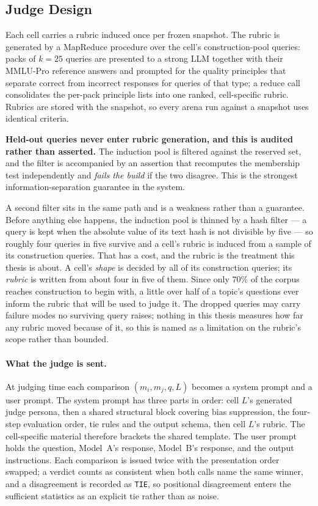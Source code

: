 \subsection{Judge Design}\label{sec:arch-judge}

Each cell carries a rubric induced once per frozen snapshot. The rubric
is generated by a MapReduce procedure over the cell's construction-pool
queries: packs of $k = 25$ queries are presented to a strong LLM
together with their MMLU-Pro reference answers and prompted for the
quality principles that separate correct from incorrect responses for
queries of that type; a reduce call consolidates the per-pack principle
lists into one ranked, cell-specific rubric. Rubrics are stored with
the snapshot, so every arena run against a snapshot uses identical
criteria.

\textbf{Held-out queries never enter rubric generation, and this is
audited rather than asserted.} The induction pool is filtered against
the reserved set, and the filter is accompanied by an assertion that
recomputes the membership test independently and \emph{fails the build}
if the two disagree. This is the strongest information-separation
guarantee in the system.

A second filter sits in the same path and is a weakness rather than a
guarantee. Before anything else happens, the induction pool is thinned
by a hash filter --- a query is kept when the absolute value of its
text hash is not divisible by five --- so roughly four queries in five
survive and a cell's rubric is induced from a sample of its
construction queries.
That has a cost, and the rubric is the treatment this thesis is about. A cell's \emph{shape} is decided by
all of its construction queries; its \emph{rubric} is written from
about four in five of them. Since only $70\%$ of the corpus reaches
construction to begin with, a little over half of a topic's questions
ever inform the rubric that will be used to judge it.
The dropped queries may carry failure modes no surviving query
raises; nothing in this thesis measures how far any rubric moved
because of it, so this is named as a limitation on the rubric's scope
rather than bounded.

\paragraph{What the judge is sent.}
At judging time each comparison $(m_i, m_j, q, L)$ becomes a system
prompt and a user prompt. The system prompt has three parts in order:
cell $L$'s generated judge persona, then a shared structural block
covering bias suppression, the four-step evaluation order, tie rules
and the output schema, then cell $L$'s rubric. The cell-specific
material therefore brackets the shared template. The user prompt holds the question, Model~A's
response, Model~B's response, and the output instructions.
Each comparison is issued twice with the presentation order swapped; a
verdict counts as consistent when both calls name the same winner, and
a disagreement is recorded as \texttt{TIE}, so positional
disagreement enters the sufficient statistics as an explicit tie
rather than as noise.

